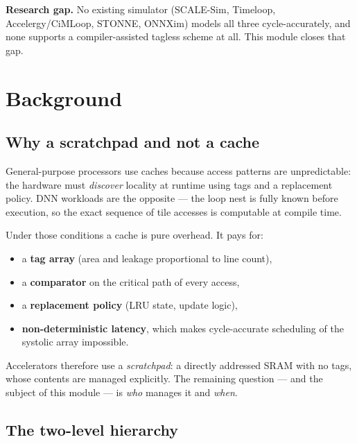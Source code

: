\documentclass[11pt,a4paper]{article}
\begin{document}
\noindent\textbf{Research gap.} No existing simulator (SCALE-Sim, Timeloop,
Accelergy/CiMLoop, STONNE, ONNXim) models all three cycle-accurately, and none
supports a compiler-assisted tagless scheme at all. This module closes that gap.

\section{Background}

\subsection{Why a scratchpad and not a cache}

General-purpose processors use caches because access patterns are unpredictable:
the hardware must \emph{discover} locality at runtime using tags and a
replacement policy. DNN workloads are the opposite --- the loop nest is fully
known before execution, so the exact sequence of tile accesses is computable at
compile time.

Under those conditions a cache is pure overhead. It pays for:

\begin{itemize}[leftmargin=1.4em,itemsep=2pt]
  \item a \textbf{tag array} (area and leakage proportional to line count),
  \item a \textbf{comparator} on the critical path of every access,
  \item a \textbf{replacement policy} (LRU state, update logic),
  \item \textbf{non-deterministic latency}, which makes cycle-accurate
        scheduling of the systolic array impossible.
\end{itemize}

Accelerators therefore use a \emph{scratchpad}: a directly addressed SRAM with
no tags, whose contents are managed explicitly. The remaining question --- and
the subject of this module --- is \emph{who} manages it and \emph{when}.

\subsection{The two-level hierarchy}
\end{document}
